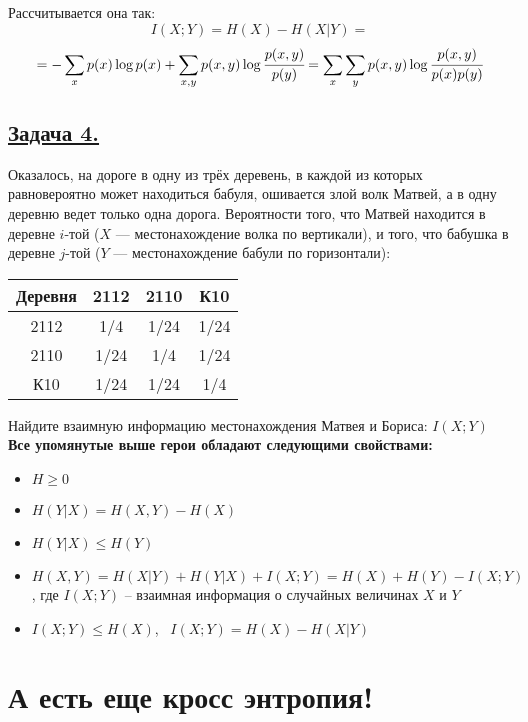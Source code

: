 Рассчитывается она так:
\[I(X; Y)=H(X)-H(X|Y)=\]
\[=-\sum\limits_{x} p(x)\log p(x) +\sum\limits_{x, y} p(x, y)\log \cfrac{p(x, y)}{p(y)} =
\sum\limits_{x}\sum\limits_{y} p(x, y)\log \cfrac{p(x, y)}{p(x)p(y)} \]

\subsection*{\hyperref[sec:sol_problem4]{Задача 4.}}\label{sec:problem4}  Оказалось, на дороге в одну из трёх деревень, в каждой из которых равновероятно может находиться бабуля, ошивается злой волк Матвей, а в одну деревню ведет только одна дорога. Вероятности того, что Матвей находится в деревне $i$-той ($X$ --- местонахождение волка по вертикали), и того, что бабушка в деревне $j$-той ($Y$ --- местонахождение бабули по горизонтали):
\begin{center}
    \begin{tabular}{c||c|c|c}
        Деревня & 2112 & 2110 & К10 \\
        \hline
        \hline
        2112 & 1/4 & 1/24 & 1/24 \\
        \hline
        2110 & 1/24 & 1/4 & 1/24 \\
        \hline
        К10 & 1/24 & 1/24 & 1/4 \\
    \end{tabular}
\end{center}

Найдите взаимную информацию местонахождения Матвея и Бориса: $I(X; Y)$
\\

\textbf{Все упомянутые выше герои обладают следующими свойствами:}

\begin{itemize}
	\item $H \geqslant 0$
	\item $H(Y|X)=H(X, Y)-H(X)$ 
	\item $H(Y|X)\leqslant H(Y)$
	\item $H(X, Y)=H(X|Y)+H(Y|X)+I(X; Y)=H(X)+H(Y)-I(X; Y)$, где $I(X; Y)$ -- взаимная информация о случайных величинах $X$ и $Y$
	\item $I(X; Y)\leqslant H(X)$, \ $I(X; Y)=H(X)-H(X|Y)$
\end{itemize}

\section*{А есть еще кросс энтропия!}~\
\\

